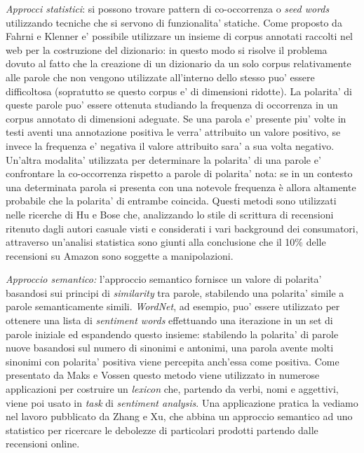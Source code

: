 \documentclass[a4paper,12pt,openright,twoside]{report}
\theoremstyle{definition}
\begin{document}
\emph{Approcci statistici}: si possono trovare pattern di co-occorrenza o \emph{seed words}
utilizzando tecniche che si servono di funzionalita' statiche.
Come proposto da Fahrni e Klenner %
e' possibile utilizzare un insieme di corpus annotati raccolti nel web per la costruzione
del dizionario: in questo modo si risolve il problema dovuto al fatto che la creazione di un dizionario
da un solo corpus relativamente alle parole che non vengono utilizzate
all'interno dello stesso puo' essere difficoltosa (sopratutto se questo corpus e' di dimensioni ridotte).
La polarita' di queste parole puo' essere ottenuta studiando la frequenza di occorrenza in 
un corpus annotato di dimensioni adeguate. Se una parola e' presente piu' volte in testi aventi una annotazione
positiva le verra' attribuito un valore positivo, se invece la frequenza e' negativa il valore
attribuito sara' a sua volta negativo. Un'altra modalita' utilizzata per determinare la polarita' di una parole
e' confrontare la co-occorrenza rispetto a parole di polarita' nota:
se in un contesto una determinata parola si presenta con 
una notevole frequenza è allora altamente probabile che la polarita' di entrambe coincida. 
Questi metodi sono utilizzati nelle ricerche di Hu e Bose %
che, analizzando lo stile di scrittura di recensioni ritenuto dagli autori casuale visti e considerati 
i vari background dei consumatori, attraverso un'analisi statistica sono giunti alla conclusione
che il 10\% delle recensioni su Amazon sono soggette a manipolazioni.

\emph{Approccio semantico:} l'approccio semantico fornisce un valore di polarita' basandosi sui principi
di \emph{similarity} tra parole, stabilendo una polarita' simile a parole semanticamente simili.
\emph{WordNet}, ad esempio, puo' essere utilizzato per ottenere una lista di \emph{sentiment words} effettuando una 
iterazione in un set di parole iniziale ed espandendo questo insieme: stabilendo la polarita' di parole
nuove basandosi sul numero di sinonimi e antonimi, una parola avente molti sinonimi
con polarita' positiva viene percepita anch'essa come positiva.
Come presentato da Maks e Vossen %
questo metodo viene utilizzato in numerose applicazioni per costruire un \emph{lexicon} che, partendo da verbi,
nomi e aggettivi, viene poi usato in \emph{task} di \emph{sentiment analysis}. Una applicazione pratica la vediamo nel lavoro
pubblicato da Zhang e Xu, %
che abbina un approccio semantico ad uno statistico per ricercare le debolezze di particolari prodotti
partendo dalle recensioni online.
\end{document}
